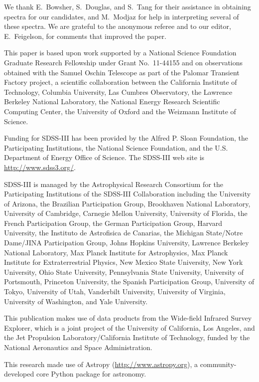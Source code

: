 \documentclass{emulateapj}
\begin{document}
\acknowledgments
We thank E.~Bowsher, S.~Douglas, and S.~Tang for their assistance in obtaining spectra for our candidates, and M.~Modjaz for help in interpreting several of these spectra. We are grateful to the anonymous referee and to our editor, E.~Feigelson, for comments that improved the paper.

This paper is based upon work supported by a National Science Foundation Graduate Research Fellowship under Grant No.\ 11-44155 and on observations obtained with the Samuel Oschin Telescope as part of the Palomar Transient Factory project, a scientific collaboration between the California Institute of Technology, Columbia University, Las Cumbres Observatory, the Lawrence Berkeley National Laboratory, the National Energy Research Scientific Computing Center, the University of Oxford and the Weizmann Institute of Science. 

Funding for SDSS-III has been provided by the Alfred P. Sloan Foundation, the Participating Institutions, the National Science Foundation, and the U.S. Department of Energy Office of Science. The SDSS-III web site is \url{http://www.sdss3.org/}.

SDSS-III is managed by the Astrophysical Research Consortium for the Participating Institutions of the SDSS-III Collaboration including the University of Arizona, the Brazilian Participation Group, Brookhaven National Laboratory, University of Cambridge, Carnegie Mellon University, University of Florida, the French Participation Group, the German Participation Group, Harvard University, the Instituto de Astrofisica de Canarias, the Michigan State/Notre Dame/JINA Participation Group, Johns Hopkins University, Lawrence Berkeley National Laboratory, Max Planck Institute for Astrophysics, Max Planck Institute for Extraterrestrial Physics, New Mexico State University, New York University, Ohio State University, Pennsylvania State University, University of Portsmouth, Princeton University, the Spanish Participation Group, University of Tokyo, University of Utah, Vanderbilt University, University of Virginia, University of Washington, and Yale University. 

This publication makes use of data products from the Wide-field Infrared Survey Explorer, which is a joint project of the University of California, Los Angeles, and the Jet Propulsion Laboratory/California Institute of Technology, funded by the National Aeronautics and Space Administration.

This research made use of Astropy (\url{http://www.astropy.org}), a community-developed core Python package for astronomy.
\end{document}

